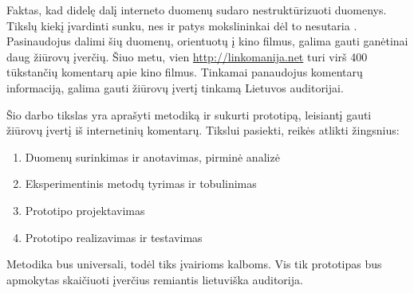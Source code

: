 Faktas, kad didelę dalį interneto duomenų sudaro nestruktūrizuoti duomenys. Tikslų
kiekį įvardinti sunku, nes ir patys mokslininkai dėl to nesutaria \cite{unstructured_data}.
Pasinaudojus dalimi šių duomenų, orientuotų į kino filmus, galima gauti ganėtinai daug
žiūrovų įverčių. Šiuo metu, vien \url{http://linkomanija.net} turi virš 400 tūkstančių komentarų
apie kino filmus. Tinkamai panaudojus komentarų informaciją, galima gauti žiūrovų įvertį
tinkamą Lietuvos auditorijai.

Šio darbo tikslas yra aprašyti metodiką ir sukurti prototipą, leisiantį gauti žiūrovų įvertį
iš internetinių komentarų. Tikslui pasiekti, reikės atlikti žingsnius:

\begin{enumerate}
  \item Duomenų surinkimas ir anotavimas, pirminė analizė
  \item Eksperimentinis metodų tyrimas ir tobulinimas
  \item Prototipo projektavimas
  \item Prototipo realizavimas ir testavimas
\end{enumerate}

Metodika bus universali, todėl tiks įvairioms kalboms. Vis tik prototipas bus apmokytas
skaičiuoti įverčius remiantis lietuviška auditorija.
